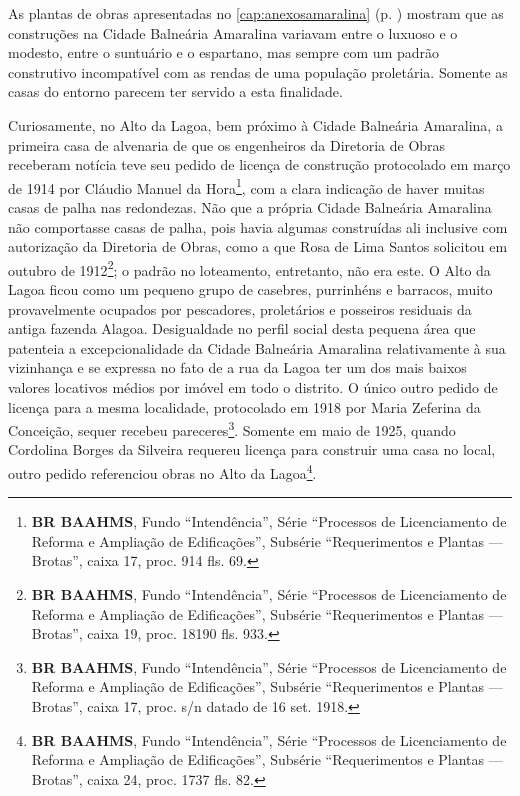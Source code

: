 
As plantas de obras apresentadas no \autoref{cap:anexosamaralina} (p. \pageref{cap:anexosamaralina}) mostram que as construções na Cidade Balneária Amaralina variavam entre o luxuoso e o modesto, entre o suntuário e o espartano, mas sempre com um padrão construtivo incompatível com as rendas de uma população proletária. Somente as casas do entorno parecem ter servido a esta finalidade.


Curiosamente, no Alto da Lagoa, bem próximo à Cidade Balneária Amaralina, a primeira casa de alvenaria de que os engenheiros da Diretoria de Obras receberam notícia teve seu pedido de licença de construção protocolado em março de 1914 por Cláudio Manuel da Hora\footnote{\textbf{BR BAAHMS}, Fundo ``Intendência'', Série ``Processos de Licenciamento de Reforma e Ampliação de Edificações'', Subsérie ``Requerimentos e Plantas --- Brotas'', caixa 17, proc. 914 fls. 69.}, com a clara indicação de haver muitas casas de palha nas redondezas. Não que a própria Cidade Balneária Amaralina não comportasse casas de palha, pois havia algumas construídas ali inclusive com autorização da Diretoria de Obras, como a que Rosa de Lima Santos solicitou em outubro de 1912\footnote{\textbf{BR BAAHMS}, Fundo ``Intendência'', Série ``Processos de Licenciamento de Reforma e Ampliação de Edificações'', Subsérie ``Requerimentos e Plantas --- Brotas'', caixa 19, proc. 18190 fls. 933.}; o padrão no loteamento, entretanto, não era este. O Alto da Lagoa ficou como um pequeno grupo de casebres, purrinhéns e barracos, muito provavelmente ocupados por pescadores, proletários e posseiros residuais da antiga fazenda Alagoa. Desigualdade no perfil social desta pequena área que patenteia a excepcionalidade da Cidade Balneária Amaralina relativamente à sua vizinhança e se expressa no fato de a rua da Lagoa ter um dos mais baixos valores locativos médios por imóvel em todo o distrito. O único outro pedido de licença para a mesma localidade, protocolado em 1918 por Maria Zeferina da Conceição, sequer recebeu pareceres\footnote{\textbf{BR BAAHMS}, Fundo ``Intendência'', Série ``Processos de Licenciamento de Reforma e Ampliação de Edificações'', Subsérie ``Requerimentos e Plantas --- Brotas'', caixa 17, proc. s/n datado de 16 set. 1918.}. Somente em maio de 1925, quando Cordolina Borges da Silveira requereu licença para construir uma casa no local, outro pedido referenciou obras no Alto da Lagoa\footnote{\textbf{BR BAAHMS}, Fundo ``Intendência'', Série ``Processos de Licenciamento de Reforma e Ampliação de Edificações'', Subsérie ``Requerimentos e Plantas --- Brotas'', caixa 24, proc. 1737 fls. 82.}.

